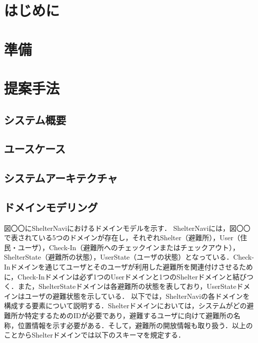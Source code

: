 \documentclass[technicalreport,dvipdfmx]{ieicej}
\begin{document}
\begin{jabstract}
\end{jabstract}
\begin{jkeyword}
\end{jkeyword}
\begin{eabstract}
\end{eabstract}
\begin{ekeyword}
\end{ekeyword}
\maketitle

\section{はじめに}

\section{準備}

\section{提案手法}
\subsection{システム概要}

\subsection{ユースケース}

\subsection{システムアーキテクチャ}

\subsection{ドメインモデリング}
図〇〇にShelterNaviにおけるドメインモデルを示す．
ShelterNaviには，図〇〇で表されている5つのドメインが存在し，それぞれShelter（避難所），User（住民・ユーザ），Check-In（避難所へのチェックインまたはチェックアウト），ShelterState（避難所の状態），UserState（ユーザの状態）となっている．Check-Inドメインを通じてユーザとそのユーザが利用した避難所を関連付けさせるために，Check-Inドメインは必ず1つのUserドメインと1つのShelterドメインと結びつく．また，ShelterStateドメインは各避難所の状態を表しており，UserStateドメインはユーザの避難状態を示している．
以下では，ShelterNaviの各ドメインを構成する要素について説明する．Shelterドメインにおいては，システムがどの避難所か特定するためのIDが必要であり，避難するユーザに向けて避難所の名称，位置情報を示す必要がある．そして，避難所の開放情報も取り扱う．以上のことからShelterドメインでは以下のスキーマを規定する．
\end{document}
